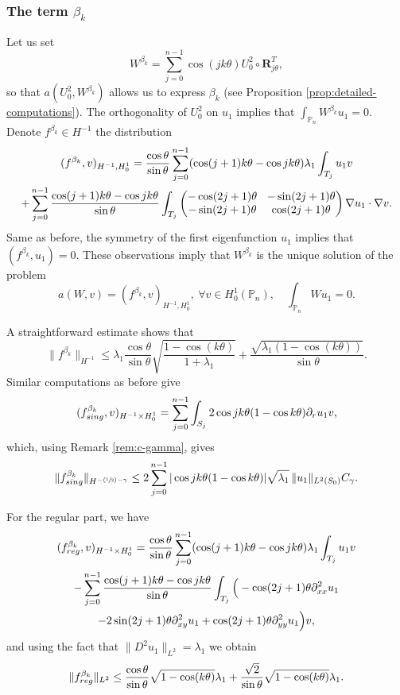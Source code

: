 \documentclass[11pt]{article}
\numberwithin{equation}{section}\newtheorem*{jepEnonce}{\jepEnonceTitle}\newenvironment{enonce*}[1]{\def\jepEnonceTitle{#1}\jepEnonce}{\endjepEnonce}\newtheorem*{conj*}{Conjecture}
\newcommand{\Psfrac}[2]{(\sfrac{#1}{#2})}
\newcommand{\colsep}{\arraycolsep4.5pt}
\theoremstyle{plain}
\theoremstyle{definition}
\newcommand{\bo}[1]{{\boldsymbol#1}}
\newcommand{\reg}{\textup{reg}}
\newcommand{\sing}{\textup{sing}}
\def\Pp{{\mathbb{P}_n}}
\newcommand{\lb}{\lambda}
\let\jepOriginalSfrac\sfrac
\renewcommand{\sfrac}[2]{{\jepOriginalSfrac{#1}{#2}}}
\begin{document}
\subsubsection*{The term $\beta_k$}
Let us set
\[
W^{\beta_k} = \sum_{j=0}^{n-1} \cos(jk\theta) U_0^2\circ \bo R_{j\theta}^T,
\]
so that $a(U_0^2,W^{\beta_k})$ allows us to express $\beta_k$ (see Proposition \ref{prop:detailed-computations}). The orthogonality of $U_0^2$ on $u_1$ implies that $\int_\Pp W^{\beta_k}u_1=0$. Denote $f^{\beta_k} \in H^{-1}$ the distribution
\vspace*{-5pt}
\begin{multline*}
(f^{\beta_k},v)_{H^{-1},H_0^1}
= \frac{\cos\theta}{\sin\theta}\sum_{j=0}^{n-1} (\cos(j+1)k\theta-\cos jk\theta) \lambda_1\int_{T_j} u_1 v\\\colsep
+ \sum_{j=0}^{n-1} \frac{\cos(j+1)k\theta-\cos jk\theta}{\sin \theta} \int_{T_j}\begin{pmatrix}
-\cos (2j+1)\theta & -\sin (2j+1) \theta \\
-\sin(2j+1)\theta & \cos (2j+1)\theta
\end{pmatrix}\nabla u_1 \cdot \nabla v.
\end{multline*}
Same as before, the symmetry of the first eigenfunction $u_1$ implies that $(f^{\beta_k},u_1) = 0$. These observations imply that $W^{\beta_k}$ is the unique solution of the problem
\[
a(W,v) = (f^{\beta_k},v)_{H^{-1},H_0^1},\ \forall v \in H_0^1(\Pp),\quad \int_\Pp Wu_1=0.
\]

A straightforward estimate shows that
\[
\|f^{\beta_k}\|_{H^{-1}} \leq \lambda_1\frac{\cos\theta}{\sin \theta} \sqrt{\frac{1-\cos(k\theta)}{1+\lambda_1}} +\frac{\sqrt{\lambda_1(1-\cos(k\theta))}}{\sin \theta}.
\]
Similar computations as before give
\[
(f_{\sing}^{\beta_k}, v)_{H^{-1}\times H^1_0} = \sum_{j=0}^{n-1}\int_{S_j} 2 \cos jk\theta(1-\cos k \theta) \partial_r u_1 v,
\]
which, using Remark \ref{rem:c-gamma}, gives
\[
\|f_{\sing}^{\beta_k}\|_{H^{-\Psfrac 12-\gamma}}\le 2\sum_{j=0}^{n-1} | \cos jk\theta(1-\cos k \theta)| \sqrt{\lb_1}\,\|u_1\|_{L^2(S_0)} C_\gamma.
\]

For the regular part, we have
\vspace*{-5pt}
\begin{multline*}(f_{\reg}^{\beta_k}, v)_{H^{-1}\times H^1_0}= \frac{\cos \theta}{\sin \theta}\sum_{j=0}^{n-1} (\cos (j+1)k\theta-\cos jk\theta) \lb_1 \int_{T_j} u_1v \\
- \sum_{j=0}^{n-1} \frac{\cos(j+1)k\theta-\cos jk\theta}{\sin \theta} \int_{T_j} \Big (-\cos (2j+1)\theta \partial^2_{xx}u_1 \\
-2 \sin (2j+1)\theta \partial^2_{xy} u_1+ \cos(2j+1)\theta \partial^2_{yy} u_1\Big)v,
\end{multline*}
and using the fact that $\|D^2 u_1\|_{L^2} = \lambda_1$ we obtain
\[
\|f_{\reg}^{\beta_k}\|_{L^2}\le \frac{\cos\theta}{\sin \theta}\sqrt{1-\cos (k \theta)} \lb_1 +\frac{\sqrt{2}}{\sin \theta} \sqrt{1- \cos (k \theta)}\lb_1 .
\]
\end{document}
